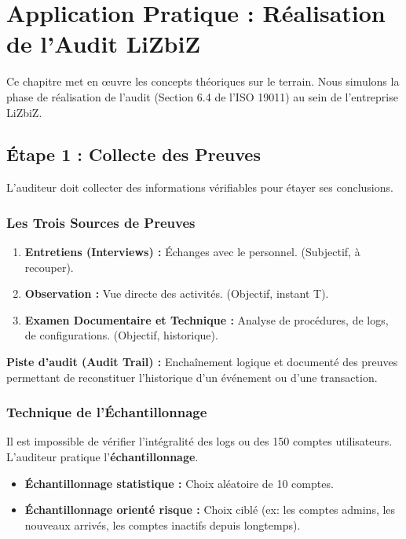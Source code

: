 \chapter{Application Pratique : Réalisation de l'Audit LiZbiZ}
\label{chap:appaudit}

Ce chapitre met en œuvre les concepts théoriques sur le terrain. Nous simulons la phase de réalisation de l'audit (Section 6.4 de l'ISO 19011) au sein de l'entreprise LiZbiZ.

\section{Étape 1 : Collecte des Preuves}

L'auditeur doit collecter des informations vérifiables pour étayer ses conclusions.

\subsection{Les Trois Sources de Preuves}

\begin{enumerate}
    \item \textbf{Entretiens (Interviews) :} Échanges avec le personnel. (Subjectif, à recouper).
    \item \textbf{Observation :} Vue directe des activités. (Objectif, instant T).
    \item \textbf{Examen Documentaire et Technique :} Analyse de procédures, de logs, de configurations. (Objectif, historique).
\end{enumerate}

\begin{boxdef}
\textbf{Piste d'audit (Audit Trail) :} Enchaînement logique et documenté des preuves permettant de reconstituer l'historique d'un événement ou d'une transaction.
\end{boxdef}

\subsection{Technique de l'Échantillonnage}

Il est impossible de vérifier l'intégralité des logs ou des 150 comptes utilisateurs. L'auditeur pratique l'\textbf{échantillonnage}.

\begin{itemize}
    \item \textbf{Échantillonnage statistique :} Choix aléatoire de 10 comptes.
    \item \textbf{Échantillonnage orienté risque :} Choix ciblé (ex: les comptes admins, les nouveaux arrivés, les comptes inactifs depuis longtemps).
\end{itemize}

